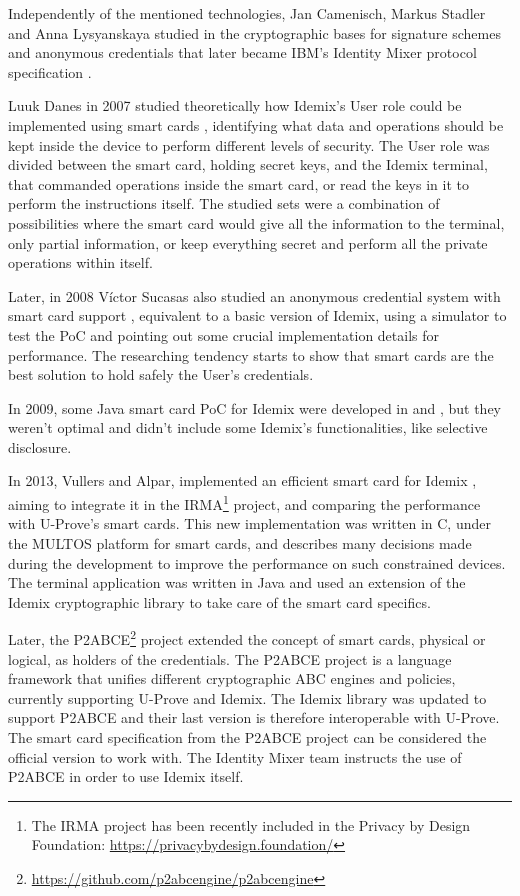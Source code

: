\hfil

Independently of the mentioned technologies, Jan Camenisch, Markus Stadler and Anna Lysyanskaya studied in \cite{Camenisch:GroupSig,Camenisch:AnonCred,camenisch2002signature} 
the cryptographic bases for signature schemes and anonymous credentials that later became IBM's Identity Mixer protocol specification \cite{idemixSpec}.


Luuk Danes in 2007 studied theoretically how Idemix's User role could be implemented using  
smart cards \cite{luuk}, identifying what data and operations should be kept inside the device to perform different levels of security. The User role was divided between the smart card, holding secret keys, and the Idemix terminal, that commanded operations inside the smart card, or read the keys in it to perform the instructions itself. The studied sets were a combination of possibilities where the smart card would give all the information to the terminal, only partial information, or keep everything secret and perform all the private operations within itself.

Later, in 2008 V\'ictor Sucasas also studied an anonymous credential system with smart card support \cite{sucasas}, equivalent to a basic version of Idemix, using a simulator to test the PoC and pointing out some crucial implementation details for performance. The researching tendency starts to show that smart cards are the best solution to hold safely the User's credentials.

In 2009, some Java smart card PoC for Idemix were developed in \cite{javaIdemix1} and \cite{javaIdemix2}, but they weren't optimal and didn't include some Idemix's functionalities, like selective disclosure.

In 2013, Vullers and Alpar, implemented an efficient smart card for Idemix \cite{vullers2013efficient}, aiming to integrate it in the IRMA\footnote{The IRMA project has been recently included in the Privacy by Design Foundation: \url{https://privacybydesign.foundation/}} project, and comparing the performance with U-Prove's smart cards. This new implementation was written in C, under the MULTOS platform for smart cards, and describes many decisions made during the development to improve the performance on such constrained devices. The terminal application was written in Java and used an extension of the Idemix cryptographic library to take care of the smart card specifics.


Later, the P2ABCE\footnote{\url{https://github.com/p2abcengine/p2abcengine}} project extended the concept of smart cards, physical or logical, as holders of the credentials.  The P2ABCE project is a language framework that unifies different cryptographic ABC engines and policies, currently supporting U-Prove and Idemix. The Idemix library was updated to support P2ABCE and their last version is therefore interoperable with U-Prove. The smart card specification from the P2ABCE project can be considered the official version to work with. The Identity Mixer team instructs the use of P2ABCE in order to use Idemix itself.


